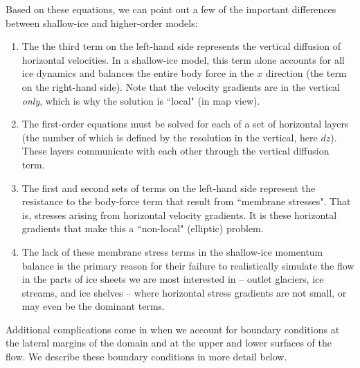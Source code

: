 Based on these equations, we can point out a few of the important differences between shallow-ice and higher-order models: 
\begin{enumerate}
\item  The the third term on the left-hand side represents the vertical diffusion of horizontal velocities. In a shallow-ice model, this term alone accounts for all ice dynamics and balances the entire body force in the $x$ direction (the term on the right-hand side). Note that the velocity gradients are in the vertical \textit{only}, which is why the solution is ``local" (in map view).

\item  The first-order equations must be solved for each of a set of horizontal layers (the number of which is defined by the resolution in the vertical, here $dz$). These layers communicate with each other through the vertical diffusion term.

\item  The first and second sets of terms on the left-hand side represent the resistance to the body-force term that result from ``membrane stresses". That is, stresses arising from horizontal velocity gradients. It is these horizontal gradients that make this a ``non-local" (elliptic) problem.

\item  The lack of these membrane stress terms in the shallow-ice momentum balance is the primary reason for their failure to realistically simulate the flow in the parts of ice sheets we are most interested in -- outlet glaciers, ice streams, and ice shelves -- where horizontal stress gradients are not small, or may even be the dominant terms.  

\end{enumerate}

Additional complications come in when we account for boundary conditions at the lateral margins of the domain and at the upper and lower surfaces of the flow. We describe these boundary conditions in more detail below.

